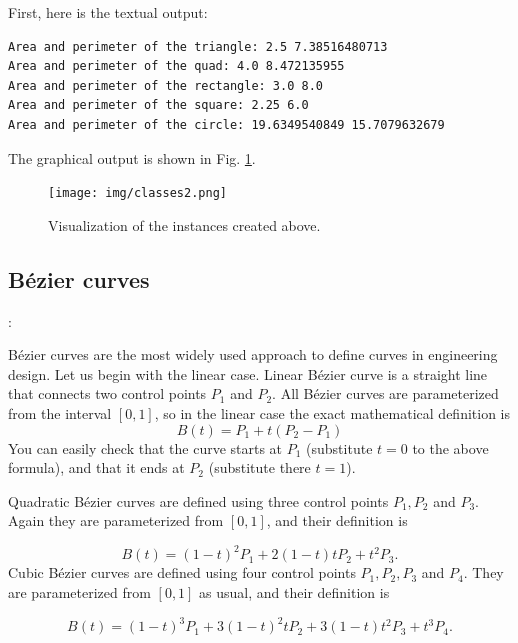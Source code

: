 \documentclass[article,A4,12pt]{llncs}
\begin{document}
\noindent
First, here is the textual output:\\

\begin{ybox}
\begin{verbatim}
Area and perimeter of the triangle: 2.5 7.38516480713
Area and perimeter of the quad: 4.0 8.472135955
Area and perimeter of the rectangle: 3.0 8.0
Area and perimeter of the square: 2.25 6.0
Area and perimeter of the circle: 19.6349540849 15.7079632679
\end{verbatim}
\end{ybox}
\vspace{6mm}

\noindent
The graphical output is shown in Fig. \ref{fig:classes2}.

\begin{figure}[!ht]
\begin{center}
\texttt{[image: img/classes2.png]}
\end{center}
\vspace{-2mm}
\caption{Visualization of the instances created above.}
\label{fig:classes2}
\end{figure}

\subsection*{B\'ezier curves}: 

\noindent
B\'ezier curves are the most widely used approach to define curves in engineering design. 
Let us begin with the linear case. Linear B\'ezier curve is a straight line that
connects two control points $P_1$ and $P_2$. All B\'ezier curves are parameterized
from the interval $[0, 1]$, so in the linear case the exact mathematical definition is
$$
  B(t) = P_1 + t(P_2 - P_1)
$$ 
You can easily check that the curve starts at $P_1$ (substitute $t = 0$ to the above formula),
and that it ends at $P_2$ (substitute there $t = 1$).

Quadratic B\'ezier curves are defined using three control points $P_1, P_2$ and $P_3$. Again they are
parameterized from $[0, 1]$, and their definition is

$$
  B(t) = (1 - t)^2 P_1 + 2(1 - t)t P_2 + t^2 P_3.
$$ 
Cubic B\'ezier curves are defined using four control points $P_1, P_2, P_3$ and $P_4$. They are
parameterized from $[0, 1]$ as usual, and their definition is

$$
  B(t) = (1 - t)^3 P_1 + 3(1 - t)^2t P_2 + 3(1-t)t^2 P_3 + t^3 P_4.
$$ 
\end{document}
